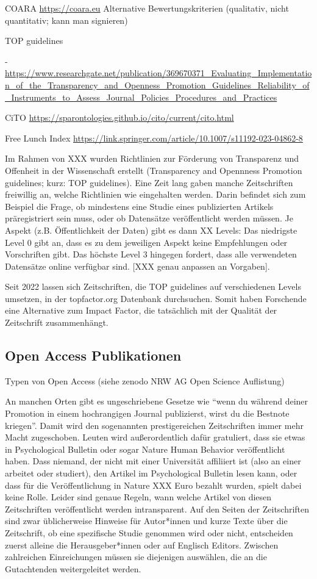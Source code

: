 \documentclass[
  letterpaper,
  DIV=11,
  numbers=noendperiod]{scrreprt}
\begin{document}
COARA \url{https://coara.eu} Alternative Bewertungskriterien
(qualitativ, nicht quantitativ; kann man signieren)

TOP guidelines

-~~~~~~~~~
\url{https://www.researchgate.net/publication/369670371_Evaluating_Implementation_of_the_Transparency_and_Openness_Promotion_Guidelines_Reliability_of_Instruments_to_Assess_Journal_Policies_Procedures_and_Practices}

CiTO \url{https://sparontologies.github.io/cito/current/cito.html}

Free Lunch Index
\url{https://link.springer.com/article/10.1007/s11192-023-04862-8}

Im Rahmen von XXX wurden Richtlinien zur Förderung von Transparenz und
Offenheit in der Wissenschaft erstellt (Transparency and Opennness
Promotion guidelines; kurz: TOP guidelines). Eine Zeit lang gaben manche
Zeitschriften freiwillig an, welche Richtlinien wie eingehalten werden.
Darin befindet sich zum Beispiel die Frage, ob mindestens eine Studie
eines publizierten Artikels präregistriert sein muss, oder ob Datensätze
veröffentlicht werden müssen. Je Aspekt (z.B. Öffentlichkeit der Daten)
gibt es dann XX Levels: Das niedrigste Level 0 gibt an, dass es zu dem
jeweiligen Aspekt keine Empfehlungen oder Vorschriften gibt. Das höchste
Level 3 hingegen fordert, dass alle verwendeten Datensätze online
verfügbar sind. {[}XXX genau anpassen an Vorgaben{]}.

Seit 2022 lassen sich Zeitschriften, die TOP guidelines auf
verschiedenen Levels umsetzen, in der topfactor.org Datenbank
durchsuchen. Somit haben Forschende eine Alternative zum Impact Factor,
die tatsächlich mit der Qualität der Zeitschrift zusammenhängt.

\subsection{Open Access Publikationen}\label{sec-openaccess}

Typen von Open Access (siehe zenodo NRW AG Open Science Auflistung)

An manchen Orten gibt es ungeschriebene Gesetze wie ``wenn du während
deiner Promotion in einem hochrangigen Journal publizierst, wirst du die
Bestnote kriegen''. Damit wird den sogenannten prestigereichen
Zeitschriften immer mehr Macht zugeschoben. Leuten wird außerordentlich
dafür gratuliert, dass sie etwas in Psychological Bulletin oder sogar
Nature Human Behavior veröffentlicht haben. Dass niemand, der nicht mit
einer Universität affiliiert ist (also an einer arbeitet oder studiert),
den Artikel im Psychological Bulletin lesen kann, oder dass für die
Veröffentlichung in Nature XXX Euro bezahlt wurden, spielt dabei keine
Rolle. Leider sind genaue Regeln, wann welche Artikel von diesen
Zeitschriften veröffentlicht werden intransparent. Auf den Seiten der
Zeitschriften sind zwar üblicherweise Hinweise für Autor*innen und kurze
Texte über die Zeitschrift, ob eine spezifische Studie genommen wird
oder nicht, entscheiden zuerst alleine die Herausgeber*innen oder auf
Englisch Editors. Zwischen zahlreichen Einreichungen müssen sie
diejenigen auswählen, die an die Gutachtenden weitergeleitet werden.
\end{document}
